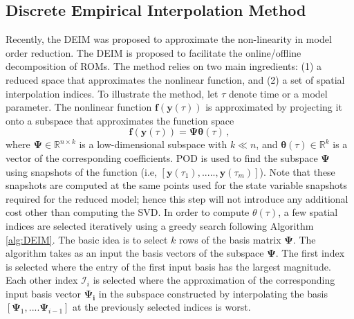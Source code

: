 \documentclass[]{interact}
\theoremstyle{plain}%
\theoremstyle{definition}
\theoremstyle{remark}
\begin{document}

\subsection{Discrete Empirical Interpolation Method}

\label{sec:DEIM}
Recently, the DEIM \cite{chaturantabut2010nonlinear} was proposed to approximate the non-linearity in model order reduction.
The DEIM is proposed to facilitate the online/offline decomposition of ROMs.
The method relies on two main ingredients: (1) a reduced space that approximates the nonlinear function, and (2) a set of spatial interpolation indices.
To illustrate the method, let $\tau$ denote time or a model parameter.
The nonlinear function $\mathbf{f}(\textbf{y}(\tau))$ is approximated by projecting it onto a subspace that approximates the function space
\begin{equation}
	\mathbf{f}(\textbf{y}(\tau)) = \mathbf{\Psi}\boldsymbol{\theta}(\tau)\, ,
\end{equation}
where $\mathbf{\Psi} \in \mathbb{R}^{n\times k}$ is a low-dimensional subspace with $k \ll n$, and $\boldsymbol{\theta}(\tau) \in \mathbb{R}^k$ is a vector of the corresponding coefficients.
POD is used to find the subspace $\mathbf{\Psi}$ using snapshots of the function (i.e, $[\textbf{y}(\tau_1), ....., \textbf{y}(\tau_m)]$).
Note that these snapshots are computed at the same points used for the state variable snapshots required for the reduced model; hence this step will not introduce any additional cost other than computing the SVD.
In order to compute $\theta(\tau)$, a few spatial indices are selected iteratively using a greedy search following Algorithm \ref{alg:DEIM}.
The basic idea is to select $k$ rows of the basis matrix $\mathbf{\Psi}$.
The algorithm takes as an input the basis vectors of the subspace $\mathbf{\Psi}$.
The first index is selected where the entry of the first input basis has the largest magnitude.
Each other index $\mathcal{I}_i$ is selected where the approximation of the corresponding input basis vector $\mathbf{\Psi_i}$ in the subspace constructed by interpolating the basis $[\mathbf{\Psi}_1, ....\mathbf{\Psi}_{i-1}]$ at the previously selected indices is worst.
\end{document}
